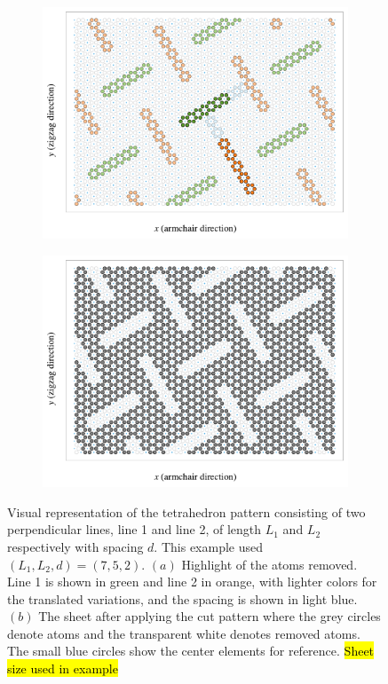 \begin{figure}[H]
  \centering
  \begin{subfigure}[t]{0.48\textwidth}
      \centering
      \includegraphics[width=\textwidth]{figures/system/pop_up_inverse.pdf}
      \caption{}
      \label{fig:pop_up_a}
    \end{subfigure}
    \hfill
    \begin{subfigure}[t]{0.48\textwidth}
      \centering
      \includegraphics[width=\textwidth]{figures/system/pop_up_pattern.pdf}
      \caption{}
      \label{fig:pop_up_b}
  \end{subfigure}
  \hfill
     \caption{Visual representation of the tetrahedron pattern consisting of two perpendicular lines, line 1 and line 2, of length $L_1$ and $L_2$ respectively with spacing $d$. This example used $(L_1, L_2, d) = (7, 5, 2)$. $(a)$ Highlight of the atoms removed. Line 1 is shown in green and line 2 in orange, with lighter colors for the translated variations, and the spacing is shown in light blue. $(b)$ The sheet after applying the cut pattern where the grey circles denote atoms and the transparent white denotes removed atoms. The small blue circles show the center elements for reference. \hl{Sheet size used in example}}
     \label{fig:pop_up}
\end{figure}

